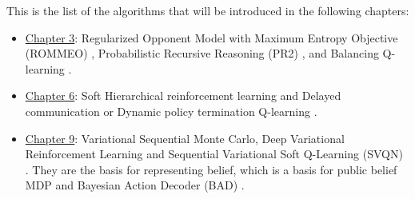 \label{sec:chap2-other-algos}
This is the list of the algorithms that will be introduced in the following chapters: 
\begin{itemize}
    \item \hyperref[chapter:chap3]{Chapter 3}: Regularized Opponent Model with Maximum Entropy Objective (ROMMEO) \cite{tian2019regularized}, Probabilistic Recursive Reasoning (PR2) \cite{wen2019probabilistic}, and Balancing Q-learning \cite{grau2018balancing}.
    \item \hyperref[chapter:chap6]{Chapter 6}: Soft Hierarchical reinforcement learning \cite{igl2019multitask, lobo2019soft} and Delayed communication or Dynamic policy termination Q-learning \cite{han2019multi}.
    \item \hyperref[chapter:chap9]{Chapter 9}: Variational Sequential Monte Carlo, Deep Variational Reinforcement Learning \cite{igl2018deep, shvechikovjoint} and Sequential Variational Soft Q-Learning (SVQN) \cite{huangsvqn}. They are the basis for representing belief, which is a basis for public belief MDP \cite{nayyar2013decentralized} and Bayesian Action Decoder (BAD) \cite{foerster2018bayesian}. 
\end{itemize}